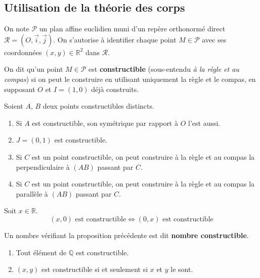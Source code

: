   \subsection{Utilisation de la théorie des corps}


  On note $\mathcal{P}$ un plan affine euclidien muni d'un repère orthonormé direct $\mathcal{R} = (O, \overrightarrow{i}, \overrightarrow{j})$. On s'autorise à identifier chaque point $M \in \mathcal{P}$ avec ses coordonnées $(x,y) \in \mathbb{R}^2$ dans $\mathcal{R}$.

  \begin{definition}
    On dit qu'un point $M \in \mathcal{P}$ est \textbf{constructible} (sous-entendu \textit{à la règle et au compas}) si on peut le construire en utilisant uniquement la règle et le compas, en supposant $O$ et $I=(1,0)$ déjà construits.
  \end{definition}

  \begin{proposition}
    Soient $A$, $B$ deux points constructibles distincts.
    \begin{enumerate}[label={\bfseries(\roman*)}]
      \item Si $A$ est constructible, son symétrique par rapport à $O$ l'est aussi.
      \item $J = (0,1)$ est constructible.
      \item Si $C$ est un point constructible, on peut construire à la règle et au compas la perpendiculaire à $(AB)$ passant par $C$.
      \item Si $C$ est un point constructible, on peut construire à la règle et au compas la parallèle à $(AB)$ passant par $C$.
    \end{enumerate}
  \end{proposition}

  \begin{proposition}
    Soit $x \in \mathbb{R}$.
    \[ (x,0) \text{ est constructible} \iff (0,x) \text{ est constructible} \]
  \end{proposition}

  \begin{definition}
    Un nombre vérifiant la proposition précédente est dit \textbf{nombre constructible}.
  \end{definition}

  \begin{proposition}
    \begin{enumerate}[label={\bfseries(\roman*)}]
      \item Tout élément de $\mathbb{Q}$ est constructible.
      \item $(x,y)$ est constructible si et seulement si $x$ et $y$ le sont.
    \end{enumerate}
  \end{proposition}


